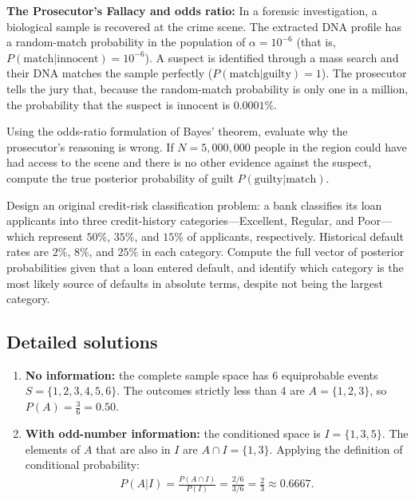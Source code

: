 \begin{problema}
	\label{prob:898898e}
	\textbf{The Prosecutor's Fallacy and odds ratio:} In a forensic investigation, a biological sample is recovered at the crime scene. The extracted DNA profile has a random-match probability in the population of $\alpha = 10^{-6}$ (that is, $P(\text{match} | \text{innocent}) = 10^{-6}$). A suspect is identified through a mass search and their DNA matches the sample perfectly ($P(\text{match} | \text{guilty}) = 1$). The prosecutor tells the jury that, because the random-match probability is only one in a million, the probability that the suspect is innocent is $0.0001\%$.

	Using the odds-ratio formulation of Bayes' theorem, evaluate why the prosecutor's reasoning is wrong. If $N = 5,000,000$ people in the region could have had access to the scene and there is no other evidence against the suspect, compute the true posterior probability of guilt $P(\text{guilty} | \text{match})$.
\end{problema}

\begin{problema}
	\label{prob:3bf9f42}
	Design an original credit-risk classification problem: a bank classifies its loan applicants into three credit-history categories---Excellent, Regular, and Poor---which represent $50\%$, $35\%$, and $15\%$ of applicants, respectively. Historical default rates are $2\%$, $8\%$, and $25\%$ in each category. Compute the full vector of posterior probabilities given that a loan entered default, and identify which category is the most likely source of defaults in absolute terms, despite not being the largest category.
\end{problema}

\subsection*{Detailed solutions}

\begin{solproblema}[prob:054ed26]
	\begin{enumerate}
		\item \textbf{No information:} the complete sample space has 6 equiprobable events $S=\{1,2,3,4,5,6\}$. The outcomes strictly less than 4 are $A=\{1,2,3\}$, so $P(A) = \frac{3}{6} = 0.50$.
		\item \textbf{With odd-number information:} the conditioned space is $I=\{1,3,5\}$. The elements of $A$ that are also in $I$ are $A \cap I = \{1,3\}$. Applying the definition of conditional probability:
		\begin{align}
			P(A|I) = \frac{P(A \cap I)}{P(I)} = \frac{2/6}{3/6} = \frac{2}{3} \approx 0.6667.
		\end{align}
	\end{enumerate}
\end{solproblema}

